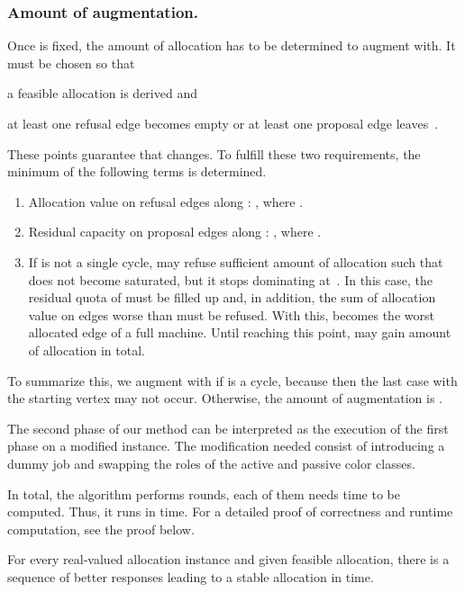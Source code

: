 \documentclass{llncs}
\begin{document}
\subsubsection*{Amount of augmentation.}
Once  is fixed, the amount of allocation  has to be determined to augment with. It must be chosen so that
\begin{inparaenum}[1)]
	\item a feasible allocation is derived and 
	\item at least one refusal edge becomes empty or at least one proposal edge leaves~. \end{inparaenum} These points guarantee that  changes. To fulfill these two requirements, the minimum of the following terms is determined.
	\begin{enumerate}
		\item Allocation value on refusal edges along : , where .
		\item Residual capacity on proposal edges along : , where .	
		\item If  is not a single cycle,  may refuse sufficient amount of allocation such that  does not become saturated, but it stops dominating  at~. In this case, the residual quota of  must be filled up and, in addition, the sum of allocation value on edges worse than  must be refused. With this,  becomes the worst allocated edge of a full machine. Until reaching this point,  may gain  amount of allocation in total.
	\end{enumerate}
To summarize this, we augment with  if  is a cycle, because then the last case with the starting vertex  may not occur. Otherwise, the amount of augmentation is .



The second phase of our method can be interpreted as the execution of the first phase on a modified instance. The modification needed consist of introducing a dummy job and swapping the roles of the active and passive color classes.

In total, the algorithm performs  rounds, each of them needs  time to be computed. Thus, it runs in  time. For a detailed proof of correctness and runtime computation, see the proof below.

\begin{theorem}
		For every real-valued allocation instance and given feasible allocation, there is a sequence of better responses leading to a stable allocation in  time.
\end{theorem}
\end{document}
